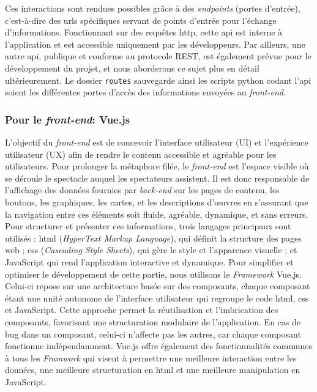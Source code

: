 Ces interactions sont rendues possibles grâce à des \textit{endpoints} (portes d'entrée), c'est-à-dire des \acrshort{url}s spécifiques servant de points d'entrée pour l'échange d'informations. Fonctionnant sur des requêtes \acrshort{http}, cette \acrshort{api} est interne à l'application et est accessible uniquement par les développeurs. Par ailleurs, une autre \acrshort{api}, publique et conforme au protocole REST, est également prévue pour le développement du projet, et nous aborderons ce sujet plus en détail ultérieurement. Le dossier \texttt{routes} sauvegarde ainsi les scripts python codant l'\acrshort{api} soient les différentes portes d'accès des informations envoyées au \textit{front-end}.


\subsubsection{Pour le \textit{front-end}: Vue.js}
L'objectif du \textit{front-end} est de concevoir l'interface utilisateur (UI) et l'expérience utilisateur (UX) afin de rendre le contenu accessible et agréable pour les utilisateurs. Pour prolonger la métaphore filée, le \textit{front-end} est l'espace visible où se déroule le spectacle auquel les spectateurs assistent. Il est donc responsable de l'affichage des données fournies par \textit{back-end} sur les pages de contenu, les boutons, les graphiques, les cartes, et les descriptions d'œuvres en s'assurant que la navigation entre ces éléments soit fluide, agréable, dynamique, et sans erreurs. Pour structurer et présenter ces informations, trois langages principaux sont utilisés : \acrshort{html} (\textit{HyperText Markup Language}), qui définit la structure des pages web ; \acrshort{css} (\textit{Cascading Style Sheets}), qui gère le style et l'apparence visuelle ; et JavaScript qui rend l'application interactive et dynamique. Pour simplifier et optimiser le développement de cette partie, nous utilisons le \textit{Framework} Vue.js. Celui-ci repose sur une architecture basée sur des composants, chaque composant étant une unité autonome de l'interface utilisateur qui regroupe le code \acrshort{html}, \acrshort{css} et JavaScript. Cette approche permet la réutilisation et l'imbrication des composants, favorisant une structuration modulaire de l'application. En cas de bug dans un composant, celui-ci n'affecte pas les autres, car chaque composant fonctionne indépendamment. Vue.js offre également des fonctionnalités communes à tous les \textit{Framwork} qui visent à permettre une meilleure interaction entre les données, une meilleure structuration en \acrshort{html} et une meilleure manipulation en JavaScript. 

